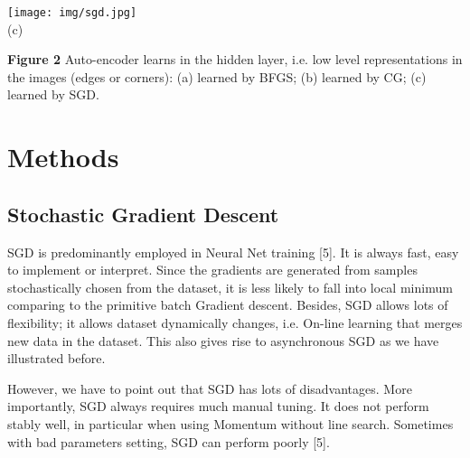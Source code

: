 \documentclass{article} %
\begin{document}
\begin{center}
\texttt{[image: img/sgd.jpg]} \\
(c)
\end{center}
{\bf Figure 2} Auto-encoder learns in the hidden layer, i.e. low level representations in the images (edges or corners): (a) learned by BFGS; (b) learned by CG; (c) learned by SGD.

\section{Methods}
\subsection{Stochastic Gradient Descent}
SGD is predominantly employed in Neural Net training [5]. It is always fast, easy to implement or interpret. Since the gradients are generated from samples stochastically chosen from the dataset, it is less likely to fall into local minimum comparing to the primitive batch Gradient descent. Besides, SGD allows lots of flexibility; it allows dataset dynamically changes, i.e. On-line learning that merges new data in the dataset. This also gives rise to asynchronous SGD as we have illustrated before.

However, we have to point out that SGD has lots of disadvantages. More importantly, SGD always requires much manual tuning. It does not perform stably well, in particular when using Momentum without line search. Sometimes with bad parameters setting, SGD can perform poorly [5].
\end{document}

